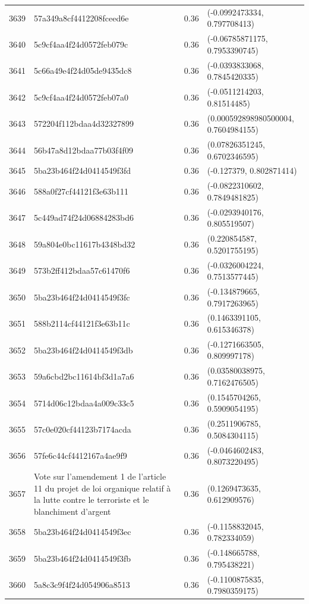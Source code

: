 \begin{table}[ht]
\begin{tabular}{rlrl}
  3639 & 57a349a8cf4412208fceed6e & 0.36 & (-0.0992473334, 0.797708413) \\ 
  3640 & 5c9cf4aa4f24d0572feb079c & 0.36 & (-0.06785871175, 0.7953390745) \\ 
  3641 & 5c66a49e4f24d05de9435dc8 & 0.36 & (-0.0393833068, 0.7845420335) \\ 
  3642 & 5c9cf4aa4f24d0572feb07a0 & 0.36 & (-0.0511214203, 0.81514485) \\ 
  3643 & 572204f112bdaa4d32327899 & 0.36 & (0.000592898980500004, 0.7604984155) \\ 
  3644 & 56b47a8d12bdaa77b03f4f09 & 0.36 & (0.07826351245, 0.6702346595) \\ 
  3645 & 5ba23b464f24d0414549f3fd & 0.36 & (-0.127379, 0.802871414) \\ 
  3646 & 588a0f27cf44121f3e63b111 & 0.36 & (-0.0822310602, 0.7849481825) \\ 
  3647 & 5c449ad74f24d06884283bd6 & 0.36 & (-0.0293940176, 0.805519507) \\ 
  3648 & 59a804e0bc11617b4348bd32 & 0.36 & (0.220854587, 0.5201755195) \\ 
  3649 & 573b2ff412bdaa57c61470f6 & 0.36 & (-0.0326004224, 0.7513577445) \\ 
  3650 & 5ba23b464f24d0414549f3fc & 0.36 & (-0.134879665, 0.7917263965) \\ 
  3651 & 588b2114cf44121f3e63b11c & 0.36 & (0.1463391105, 0.615346378) \\ 
  3652 & 5ba23b464f24d0414549f3db & 0.36 & (-0.1271663505, 0.809997178) \\ 
  3653 & 59a6cbd2bc11614bf3d1a7a6 & 0.36 & (0.03580038975, 0.7162476505) \\ 
  3654 & 5714d06c12bdaa4a009c33c5 & 0.36 & (0.1545704265, 0.5909054195) \\ 
  3655 & 57c0e020cf44123b7174acda & 0.36 & (0.2511906785, 0.5084304115) \\ 
  3656 & 57fe6c44cf4412167a4ae9f9 & 0.36 & (-0.0464602483, 0.8073220495) \\ 
  3657 & Vote sur l'amendement 1 de l'article 11 du projet de loi organique relatif à la lutte contre le terroriste et le blanchiment d'argent & 0.36 & (0.1269473635, 0.612909576) \\ 
  3658 & 5ba23b464f24d0414549f3ec & 0.36 & (-0.1158832045, 0.782334059) \\ 
  3659 & 5ba23b464f24d0414549f3fb & 0.36 & (-0.148665788, 0.795438221) \\ 
  3660 & 5a8c3c9f4f24d054906a8513 & 0.36 & (-0.1100875835, 0.7980359175) \\ 

\end{tabular}
\end{table}
